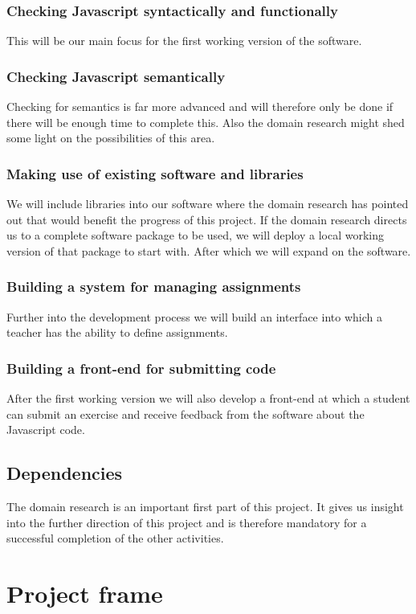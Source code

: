 \documentclass{article}
\begin{document}
\subsubsection{Checking Javascript syntactically and functionally}
This will be our main focus for the first working version of the software.
\subsubsection{Checking Javascript semantically}
Checking for semantics is far more advanced and will therefore only be done if
there will be enough time to complete this. Also the domain research might shed
some light on the possibilities of this area.
\subsubsection{Making use of existing software and libraries}
We will include libraries into our software where the domain research has
pointed out that would benefit the progress of this project. If the domain
research directs us to a complete software package to be used, we will deploy a
local working version of that package to start with. After which we will expand
on the software.
\subsubsection{Building a system for managing assignments}
Further into the development process we will build an interface into which a
teacher has the ability to define assignments.
\subsubsection{Building a front-end for submitting code}
After the first working version we will also develop a front-end at which a
student can submit an exercise and receive feedback from the software about the
Javascript code.
\subsection{Dependencies}
The domain research is an important first part of this project. It gives us
insight into the further direction of this project and is therefore mandatory
for a successful completion of the other activities.

\section{Project frame}
\end{document}
